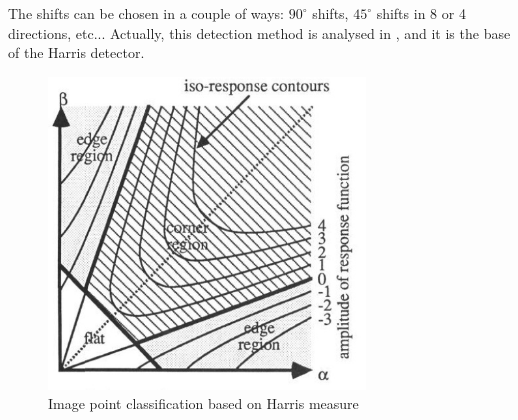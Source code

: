 The shifts can be chosen in a couple of ways: $90^\circ$ shifts, $45^\circ$ shifts in 8 or 4 directions, etc...
Actually, this detection method is analysed in \cite{Harris88alvey}, and it is the base of the Harris detector.

\begin{figure}[t]
	\centering
	\includegraphics[width=0.75\textwidth]{figures/score-isoresponse-contours.jpg}
	\caption{Image point classification based on Harris measure\cite{Harris88alvey}}
	\label{fig:harrisMeasure}
\end{figure}

